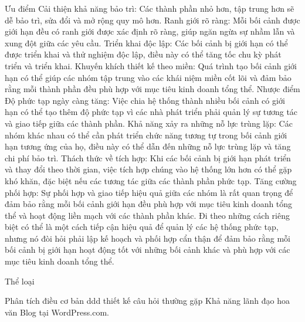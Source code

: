 Ưu điểm
Cải thiện khả năng bảo trì: Các thành phần nhỏ hơn, tập trung hơn sẽ dễ bảo trì, sửa đổi và mở rộng quy mô hơn.
Ranh giới rõ ràng: Mỗi bối cảnh được giới hạn đều có ranh giới được xác định rõ ràng, giúp ngăn ngừa sự nhầm lẫn và xung đột giữa các yêu cầu.
Triển khai độc lập: Các bối cảnh bị giới hạn có thể được triển khai và thử nghiệm độc lập, điều này có thể tăng tốc chu kỳ phát triển và triển khai.
Khuyến khích thiết kế theo miền: Quá trình tạo bối cảnh giới hạn có thể giúp các nhóm tập trung vào các khái niệm miền cốt lõi và đảm bảo rằng mỗi thành phần đều phù hợp với mục tiêu kinh doanh tổng thể.
Nhược điểm
Độ phức tạp ngày càng tăng: Việc chia hệ thống thành nhiều bối cảnh có giới hạn có thể tạo thêm độ phức tạp vì các nhà phát triển phải quản lý sự tương tác và giao tiếp giữa các thành phần.
Khả năng xảy ra những nỗ lực trùng lặp: Các nhóm khác nhau có thể cần phát triển chức năng tương tự trong bối cảnh giới hạn tương ứng của họ, điều này có thể dẫn đến những nỗ lực trùng lặp và tăng chi phí bảo trì.
Thách thức về tích hợp: Khi các bối cảnh bị giới hạn phát triển và thay đổi theo thời gian, việc tích hợp chúng vào hệ thống lớn hơn có thể gặp khó khăn, đặc biệt nếu các tương tác giữa các thành phần phức tạp.
Tăng cường phối hợp: Sự phối hợp và giao tiếp hiệu quả giữa các nhóm là rất quan trọng để đảm bảo rằng mỗi bối cảnh giới hạn đều phù hợp với mục tiêu kinh doanh tổng thể và hoạt động liền mạch với các thành phần khác.
Đi theo những cách riêng biệt có thể là một cách tiếp cận hiệu quả để quản lý các hệ thống phức tạp, nhưng nó đòi hỏi phải lập kế hoạch và phối hợp cẩn thận để đảm bảo rằng mỗi bối cảnh bị giới hạn hoạt động tốt với những bối cảnh khác và phù hợp với các mục tiêu kinh doanh tổng thể.


Thể loại

Phân tích
điều cơ bản
ddd
thiết kế
câu hỏi thường gặp
Khả năng lãnh đạo
hoa văn
Blog tại WordPress.com.

